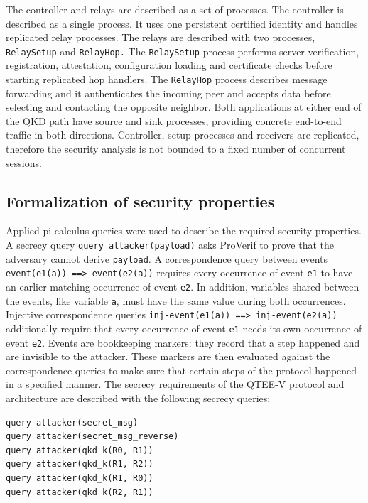 \documentclass[futureinternet,article,submit,moreauthors]{Definitions/mdpi}
\begin{document}
The controller and relays are described as a set of processes. The controller is described as a single process. It uses one persistent certified identity and handles replicated relay processes. The relays are described with two processes,  \texttt{RelaySetup} and \texttt{RelayHop.} The \texttt{RelaySetup} process performs server verification, registration, attestation, configuration loading and certificate checks before starting replicated hop handlers. The \texttt{RelayHop} process describes message forwarding and it authenticates the incoming peer and accepts data before selecting and contacting the opposite neighbor. Both applications at either end of the QKD path have source and sink processes, providing concrete end-to-end traffic in both directions. Controller, setup processes and receivers are replicated, therefore the security analysis is not bounded to a fixed number of concurrent sessions.

\subsection{Formalization of security properties}

Applied pi-calculus queries were used to describe the required security properties. A secrecy query \texttt{query attacker(payload)} asks ProVerif to prove that the adversary cannot derive \texttt{payload}. A correspondence query between events \texttt{event(e1(a)) ==> event(e2(a))} requires every occurrence of event \texttt{e1} to have an earlier matching occurrence of event \texttt{e2}. In addition, variables shared between the events, like variable \texttt{a}, must have the same value during both occurrences. Injective correspondence queries \texttt{inj-event(e1(a)) ==> inj-event(e2(a))} additionally require that every occurrence of event \texttt{e1} needs its own occurrence of event \texttt{e2}. Events are bookkeeping markers: they record that a step happened and are invisible to the attacker. These markers are then evaluated against the correspondence queries to make sure that certain steps of the protocol happened in a specified manner. The secrecy requirements of the QTEE-V protocol and architecture are described with the following secrecy queries:

\begin{lstlisting}
query attacker(secret_msg)
query attacker(secret_msg_reverse)
query attacker(qkd_k(R0, R1))
query attacker(qkd_k(R1, R2))
query attacker(qkd_k(R1, R0))
query attacker(qkd_k(R2, R1))
\end{lstlisting}
\end{document}
